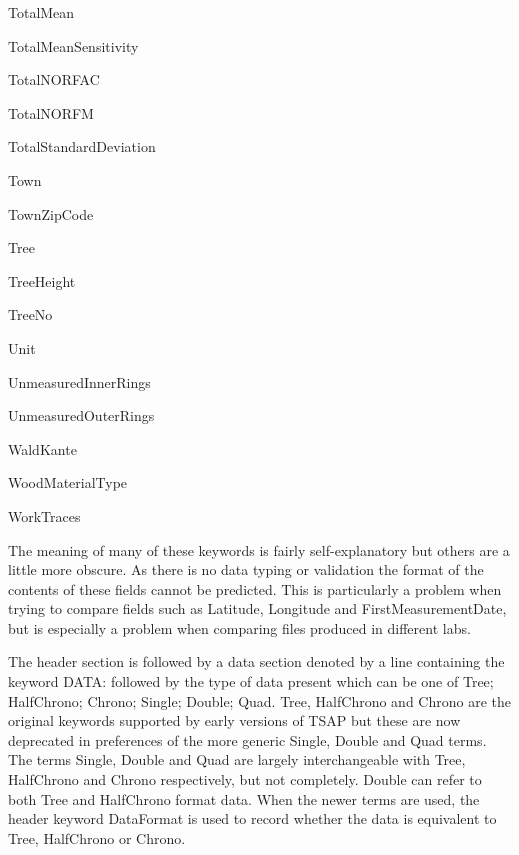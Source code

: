 \begin{multicols}{2}
\begin{itemize*}
 \item  TotalMean
 \item  TotalMeanSensitivity
 \item  TotalNORFAC
 \item  TotalNORFM
 \item  TotalStandardDeviation
 \item  Town
 \item  TownZipCode
 \item  Tree
 \item  TreeHeight
 \item  TreeNo
 \item  Unit
 \item  UnmeasuredInnerRings
 \item  UnmeasuredOuterRings
 \item  WaldKante
 \item  WoodMaterialType
 \item  WorkTraces
\end{itemize*}
\end{multicols}

The meaning of many of these keywords is fairly self-explanatory but others are a little more obscure. As there is no data typing or validation the format of the contents of these fields cannot be predicted. This is particularly a problem when trying to compare fields such as Latitude, Longitude and FirstMeasurementDate, but is especially a problem when comparing files produced in different labs.

The header section is followed by a data section denoted by a line containing the keyword DATA: followed by the type of data present which can be one of Tree; HalfChrono; Chrono; Single; Double; Quad. Tree, HalfChrono and Chrono are the original keywords supported by early versions of TSAP but these are now deprecated in preferences of the more generic Single, Double and Quad terms. The terms Single, Double and Quad are largely interchangeable with Tree, HalfChrono and Chrono respectively, but not completely. Double can refer to both Tree and HalfChrono format data. When the newer terms are used, the header keyword DataFormat is used to record whether the data is equivalent to Tree, HalfChrono or Chrono.

